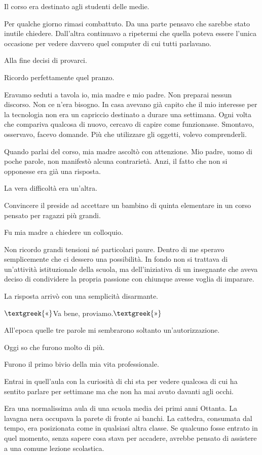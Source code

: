 \documentclass{article}
\begin{document}
Il corso era destinato agli studenti delle medie.

Per qualche giorno rimasi combattuto. Da una parte pensavo che sarebbe stato inutile chiedere. Dall'altra continuavo a
ripetermi che quella poteva essere l'unica occasione per vedere davvero quel computer di cui tutti parlavano.

Alla fine decisi di provarci.

Ricordo perfettamente quel pranzo.

Eravamo seduti a tavola io, mia madre e mio padre. Non preparai nessun discorso. Non ce n'era bisogno. In casa avevano
già capito che il mio interesse per la tecnologia non era un capriccio destinato a durare una settimana. Ogni volta che
compariva qualcosa di nuovo, cercavo di capire come funzionasse. Smontavo, osservavo, facevo domande. Più che
utilizzare gli oggetti, volevo comprenderli.

Quando parlai del corso, mia madre ascoltò con attenzione. Mio padre, uomo di poche parole, non manifestò alcuna
contrarietà. Anzi, il fatto che non si opponesse era già una risposta.

La vera difficoltà era un'altra.

Convincere il preside ad accettare un bambino di quinta elementare in un corso pensato per ragazzi più grandi.

Fu mia madre a chiedere un colloquio.

Non ricordo grandi tensioni né particolari paure. Dentro di me speravo semplicemente che ci dessero una possibilità. In
fondo non si trattava di un'attività istituzionale della scuola, ma dell'iniziativa di un insegnante che aveva deciso
di condividere la propria passione con chiunque avesse voglia di imparare.

La risposta arrivò con una semplicità disarmante.

$\text{\textgreek{«}}$Va bene, proviamo.$\text{\textgreek{»}}$

All'epoca quelle tre parole mi sembrarono soltanto un'autorizzazione.

Oggi so che furono molto di più.

Furono il primo bivio della mia vita professionale.

Entrai in quell'aula con la curiosità di chi sta per vedere qualcosa di cui ha sentito parlare per settimane ma che non
ha mai avuto davanti agli occhi.

Era una normalissima aula di una scuola media dei primi anni Ottanta. La lavagna nera occupava la parete di fronte ai
banchi. La cattedra, consumata dal tempo, era posizionata come in qualsiasi altra classe. Se qualcuno fosse entrato in
quel momento, senza sapere cosa stava per accadere, avrebbe pensato di assistere a una comune lezione scolastica.
\end{document}

